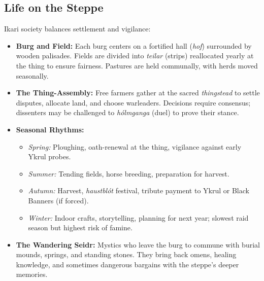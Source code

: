 \documentclass[12pt]{article}
\begin{document}
\subsection{Life on the Steppe}
Ikari society balances settlement and vigilance:
\begin{itemize}[leftmargin=*]
  \item \textbf{Burg and Field:} Each burg centers on a fortified hall (\textit{hof}) surrounded by wooden palisades. Fields are divided into \textit{teilar} (strips) reallocated yearly at the thing to ensure fairness. Pastures are held communally, with herds moved seasonally.
  \item \textbf{The Thing-Assembly:} Free farmers gather at the sacred \textit{thingstead} to settle disputes, allocate land, and choose warleaders. Decisions require consensus; dissenters may be challenged to \textit{hólmganga} (duel) to prove their stance.
  \item \textbf{Seasonal Rhythms:} 
  \begin{itemize}[leftmargin=*]
    \item \textit{Spring:} Ploughing, oath-renewal at the thing, vigilance against early Ykrul probes.
    \item \textit{Summer:} Tending fields, horse breeding, preparation for harvest.
    \item \textit{Autumn:} Harvest, \textit{haustblót} festival, tribute payment to Ykrul or Black Banners (if forced).
    \item \textit{Winter:} Indoor crafts, storytelling, planning for next year; slowest raid season but highest risk of famine.
  \end{itemize}
  \item \textbf{The Wandering Seidr:} Mystics who leave the burg to commune with burial mounds, springs, and standing stones. They bring back omens, healing knowledge, and sometimes dangerous bargains with the steppe's deeper memories.
\end{itemize}
\end{document}
